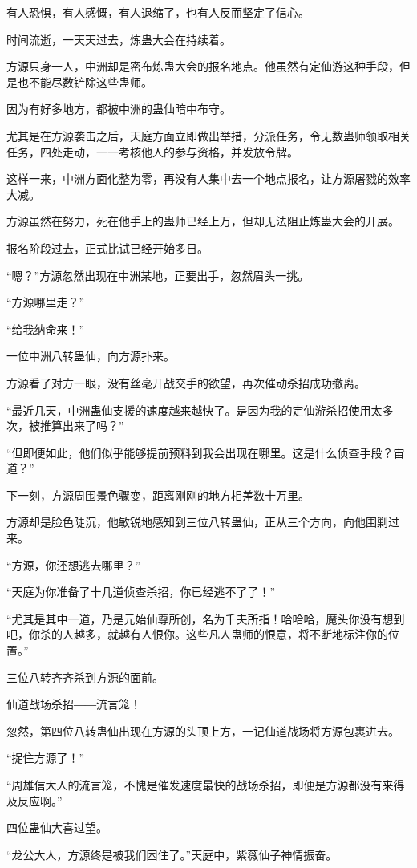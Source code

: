 \begin{this_body}
有人恐惧，有人感慨，有人退缩了，也有人反而坚定了信心。

时间流逝，一天天过去，炼蛊大会在持续着。

方源只身一人，中洲却是密布炼蛊大会的报名地点。他虽然有定仙游这种手段，但是也不能尽数铲除这些蛊师。

因为有好多地方，都被中洲的蛊仙暗中布守。

尤其是在方源袭击之后，天庭方面立即做出举措，分派任务，令无数蛊师领取相关任务，四处走动，一一考核他人的参与资格，并发放令牌。

这样一来，中洲方面化整为零，再没有人集中去一个地点报名，让方源屠戮的效率大减。

方源虽然在努力，死在他手上的蛊师已经上万，但却无法阻止炼蛊大会的开展。

报名阶段过去，正式比试已经开始多日。

“嗯？”方源忽然出现在中洲某地，正要出手，忽然眉头一挑。

“方源哪里走？”

“给我纳命来！”

一位中洲八转蛊仙，向方源扑来。

方源看了对方一眼，没有丝毫开战交手的欲望，再次催动杀招成功撤离。

“最近几天，中洲蛊仙支援的速度越来越快了。是因为我的定仙游杀招使用太多次，被推算出来了吗？”

“但即便如此，他们似乎能够提前预料到我会出现在哪里。这是什么侦查手段？宙道？”

下一刻，方源周围景色骤变，距离刚刚的地方相差数十万里。

方源却是脸色陡沉，他敏锐地感知到三位八转蛊仙，正从三个方向，向他围剿过来。

“方源，你还想逃去哪里？”

“天庭为你准备了十几道侦查杀招，你已经逃不了了！”

“尤其是其中一道，乃是元始仙尊所创，名为千夫所指！哈哈哈，魔头你没有想到吧，你杀的人越多，就越有人恨你。这些凡人蛊师的恨意，将不断地标注你的位置。”

三位八转齐齐杀到方源的面前。

仙道战场杀招――流言笼！

忽然，第四位八转蛊仙出现在方源的头顶上方，一记仙道战场将方源包裹进去。

“捉住方源了！”

“周雄信大人的流言笼，不愧是催发速度最快的战场杀招，即便是方源都没有来得及反应啊。”

四位蛊仙大喜过望。

“龙公大人，方源终是被我们困住了。”天庭中，紫薇仙子神情振奋。


\end{this_body}
